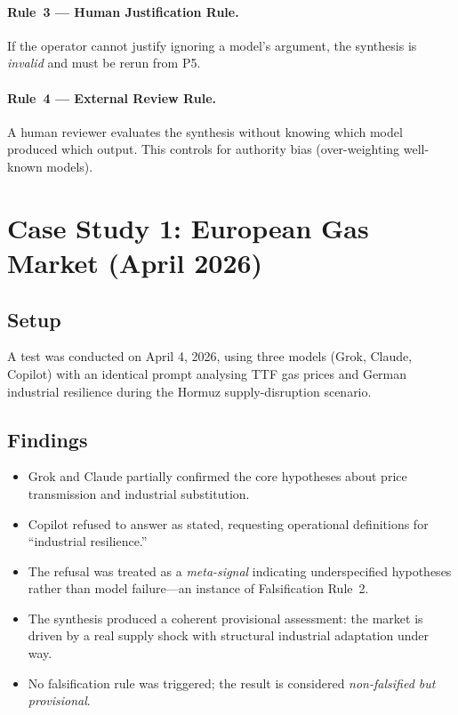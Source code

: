 \documentclass[10pt,a4paper]{article}
\begin{document}
\paragraph{Rule~3 — Human Justification Rule.}
If the operator cannot justify ignoring a model's argument, the synthesis is
\textit{invalid} and must be rerun from P5.

\paragraph{Rule~4 — External Review Rule.}
A human reviewer evaluates the synthesis without knowing which model produced
which output. This controls for authority bias (over-weighting well-known models).

\section{Case Study 1: European Gas Market (April 2026)}
\label{sec:cs1}

\subsection{Setup}
A test was conducted on April 4, 2026, using three models (Grok, Claude, Copilot)
with an identical prompt analysing TTF gas prices and German industrial resilience
during the Hormuz supply-disruption scenario.

\subsection{Findings}
\begin{itemize}
  \item Grok and Claude partially confirmed the core hypotheses about price
        transmission and industrial substitution.
  \item Copilot refused to answer as stated, requesting operational definitions
        for ``industrial resilience.''
  \item The refusal was treated as a \textit{meta-signal} indicating underspecified
        hypotheses rather than model failure—an instance of Falsification Rule~2.
  \item The synthesis produced a coherent provisional assessment: the market is
        driven by a real supply shock with structural industrial adaptation under way.
  \item No falsification rule was triggered; the result is considered
        \textit{non-falsified but provisional}.
\end{itemize}
\end{document}
